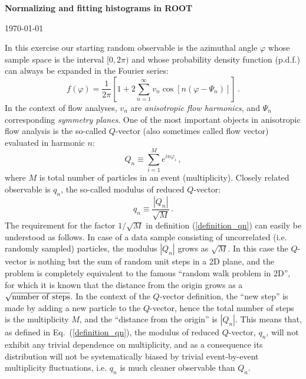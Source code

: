 \documentclass[11pt]{article}
\begin{document}
	
\begin{center}
\large{\bf{Normalizing and fitting histograms in ROOT}}\\
\end{center}
\begin{center}
{\small\today}
\end{center}

\bigskip
	
In this exercise our starting random observable is the azimuthal angle $\varphi$ whose sample space is the interval $[0,2\pi)$ and whose probability density function (p.d.f.) can always be expanded in the Fourier series:
%
\begin{equation}
f(\varphi) = \frac{1}{2\pi}\left[1+2\sum_{n=1}^\infty v_n\cos[n(\varphi-\Psi_n)]\right]\,.
\label{eq:Fourier_vn_psin}
\end{equation}
%
In the context of flow analyses, $v_n$ are {\it anisotropic flow harmonics}, and $\Psi_n$ corresponding {\it symmetry planes}. One of the most important objects in anisotropic flow analysis is the so-called $Q$-vector (also sometimes called flow vector) evaluated in harmonic $n$:
%
\begin{equation}
Q_{n}\equiv\sum_{i=1}^{M}e^{in\varphi_i}\,,
\label{a:q-vector}
\end{equation}
% 
where $M$ is total number of particles in an event (multiplicity). Closely related observable is $q_n$, the so-called modulus of reduced $Q$-vector:
% 
\begin{equation}
q_n \equiv \frac{|Q_n|}{\sqrt{M}}\,.
\label{definition_qn}
\end{equation}
%
The requirement for the factor $1/\sqrt{M}$ in definition  (\ref{definition_qn}) can easily be understood as follows. In case of a data sample consisting of uncorrelated (i.e. randomly sampled) particles, the modulus $\left|Q_n\right|$ grows as $\sqrt{M}$. In this case the $Q$-vector is nothing but the sum of random unit steps in a 2D plane, and the problem is completely equivalent to the famous ``random walk problem in 2D'', for which it is known that the distance from the origin grows as a $\sqrt{\rm number\ of\ steps}$. In the context of the $Q$-vector definition, the ``new step'' is made by adding a new particle to the $Q$-vector, hence the total number of steps is the multiplicity $M$, and the ``distance from the origin'' is $\left|Q_n\right|$. This means that, as defined in Eq.~(\ref{definition_qn}), the modulus of reduced $Q$-vector, $q_n$, will not exhibit any trivial dependence on multiplicity, and as a consequence its distribution will not be systematically biased by trivial event-by-event multiplicity fluctuations, i.e. $q_n$ is much cleaner observable than $Q_n$.
	
\end{document}
